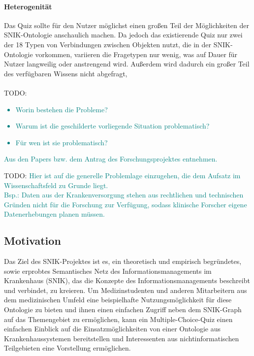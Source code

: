 \documentclass[headsepline,titlepage,ngerman,twoside,12pt]{report}
\newcommand\todo[1]{TODO: \textcolor{teal}{#1}}
\begin{document}
\paragraph{Heterogenität}
Das Quiz sollte für den Nutzer möglichst einen großen Teil der Möglichkeiten der SNIK-Ontologie anschaulich machen.
Da jedoch das existierende Quiz nur zwei der 18 Typen von Verbindungen zwischen Objekten nutzt, die in der SNIK-Ontologie vorkommen, variieren die Fragetypen nur wenig, was auf Dauer für Nutzer langweilig oder anstrengend wird. Außerdem wird dadurch ein großer Teil des verfügbaren Wissens nicht abgefragt, 
\\\\\todo{
\begin{itemize}
\item Worin bestehen die Probleme?
\item Warum ist die geschilderte vorliegende Situation problematisch?
\item Für wen ist sie problematisch?
\end{itemize}
Aus den Papers bzw. dem Antrag des Forschungsprojektes entnehmen.\\
}\todo{
Hier ist auf die generelle Problemlage einzugehen, die dem Aufsatz im Wissenschaftsfeld zu Grunde liegt.\\
Bsp.: Daten aus der Krankenversorgung stehen aus rechtlichen und technischen Gründen nicht für die Forschung zur Verfügung, sodass klinische Forscher eigene Datenerhebungen planen müssen.
}
\subsection{Motivation}
\label{sub:Motivation}
Das Ziel des SNIK-Projektes ist es, ein theoretisch und empirisch begründetes, sowie erprobtes Semantisches Netz des Informationsmanagements im Krankenhaus (SNIK), das die Konzepte des Informationsmanagements beschreibt und verbindet, zu kreieren.
Um Medizinstudenten und anderen Mitarbeitern aus dem medizinischen Umfeld eine beispielhafte Nutzungsmöglichkeit für diese Ontologie zu bieten und ihnen einen einfachen Zugriff neben dem SNIK-Graph auf das Themengebiet zu ermöglichen, kann ein Multiple-Choice-Quiz einen einfachen Einblick auf die Einsatzmöglichkeiten von einer Ontologie aus Krankenhaussystemen bereitstellen und Interessenten aus nichtinformatischen Teilgebieten eine Vorstellung ermöglichen.
\end{document}
